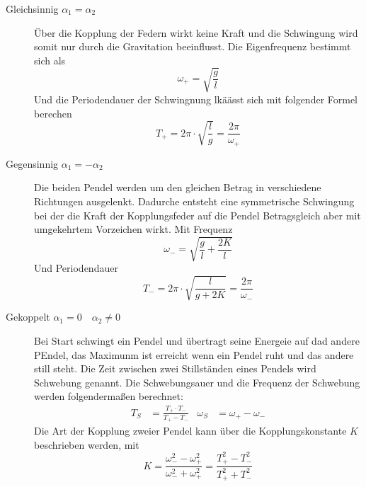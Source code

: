 \begin{description}
    \item[Gleichsinnig $\alpha_1 = \alpha_2$]
        Über die Kopplung der Federn wirkt keine Kraft und die Schwingung wird somit nur durch die Gravitation beeinflusst.
        Die Eigenfrequenz bestimmt sich als
        \begin{equation}
            \omega_+ = \sqrt{\frac{g}{l}} \label{eqn:w_p}
        \end{equation}
        Und die Periodendauer der Schwingnung lkäässt sich mit folgender Formel berechen 
        \begin{equation}
            T_+ = 2\pi \cdot \sqrt{\frac{l}{g}} = \frac{2\pi}{\omega_+} \label{eqn:T_p}
        \end{equation}
    \item[Gegensinnig $\alpha_1 = -\alpha_2$]
        Die beiden Pendel werden um den gleichen Betrag in verschiedene Richtungen ausgelenkt.
        Dadurche entsteht eine symmetrische Schwingung bei der die Kraft der Kopplungsfeder auf die Pendel Betragsgleich aber mit umgekehrtem Vorzeichen wirkt.
        Mit Frequenz
        \begin{equation}
            \omega_- = \sqrt{\frac{g}{l}+\frac{2K}{l}}\label{eqn:w_m}
        \end{equation}
        Und Periodendauer
        \begin{equation}
            T_- = 2\pi \cdot \sqrt{\frac{l}{g+2K}} = \frac{2\pi}{\omega_-}\label{eqn:T_m}
        \end{equation}
    \item[Gekoppelt $\alpha_1 =0 \quad \alpha_2 \neq 0$]
        Bei Start schwingt ein Pendel und übertragt seine Energeie auf dad andere PEndel, das Maximunm ist erreicht wenn ein Pendel ruht und das andere still steht.
        Die Zeit zwischen zwei Stillständen eines Pendels wird Schwebung genannt.
        Die Schwebungsauer und die Frequenz der Schwebung werden folgendermaßen berechnet:
        \begin{align}
            T_S &= \frac{T_+ \cdot T_-}{T_+ - T_-}  & \omega_S &= \omega_+ - \omega_- \label{eqn:Schwebung}
        \end{align}
        Die Art der Kopplung zweier Pendel kann über die Kopplungskonstante $K$ beschrieben werden, mit
        \begin{equation}
            K = \frac{\omega_-^2 - \omega_+^2}{\omega_-^2 + \omega_+^2} = \frac{T_+^2 - T_-^2}{T_+^2 + T_-^2} \label{eqn:Kopplung}
        \end{equation}
\end{description}
